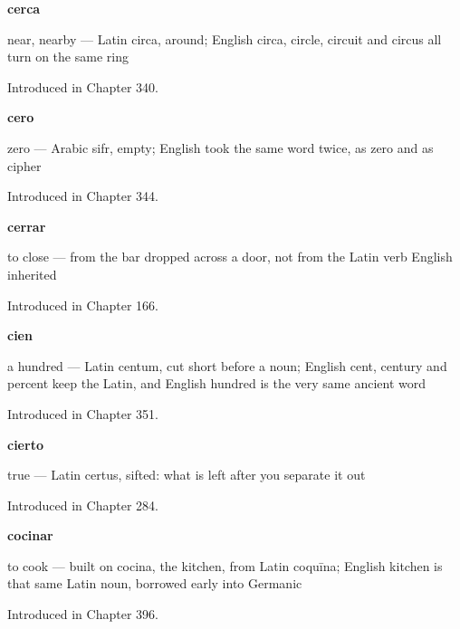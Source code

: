 \noindent\begin{minipage}[t]{\linewidth}
\raggedright
\textbf{cerca}\par
\small near, nearby — Latin circa, around; English circa, circle, circuit and circus all turn on the same ring\par
\footnotesize Introduced in Chapter 340.
\end{minipage}\par\medskip

\noindent\begin{minipage}[t]{\linewidth}
\raggedright
\textbf{cero}\par
\small zero — Arabic sifr, empty; English took the same word twice, as zero and as cipher\par
\footnotesize Introduced in Chapter 344.
\end{minipage}\par\medskip

\noindent\begin{minipage}[t]{\linewidth}
\raggedright
\textbf{cerrar}\par
\small to close — from the bar dropped across a door, not from the Latin verb English inherited\par
\footnotesize Introduced in Chapter 166.
\end{minipage}\par\medskip

\noindent\begin{minipage}[t]{\linewidth}
\raggedright
\textbf{cien}\par
\small a hundred — Latin centum, cut short before a noun; English cent, century and percent keep the Latin, and English hundred is the very same ancient word\par
\footnotesize Introduced in Chapter 351.
\end{minipage}\par\medskip

\noindent\begin{minipage}[t]{\linewidth}
\raggedright
\textbf{cierto}\par
\small true — Latin certus, sifted: what is left after you separate it out\par
\footnotesize Introduced in Chapter 284.
\end{minipage}\par\medskip

\noindent\begin{minipage}[t]{\linewidth}
\raggedright
\textbf{cocinar}\par
\small to cook — built on cocina, the kitchen, from Latin coquīna; English kitchen is that same Latin noun, borrowed early into Germanic\par
\footnotesize Introduced in Chapter 396.
\end{minipage}\par\medskip

